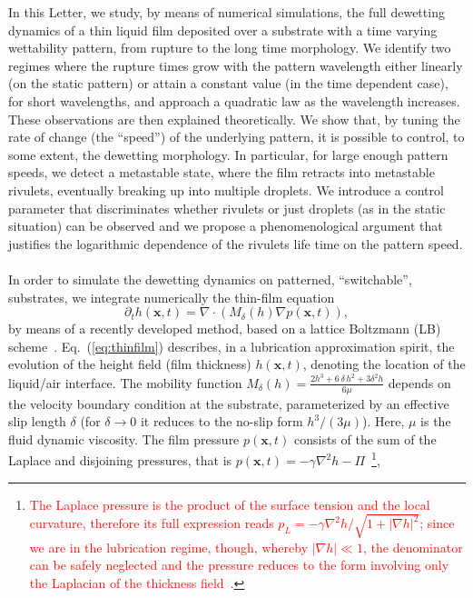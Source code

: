\documentclass[twocolumn,amsmath,amssymb,showpacs,prl,superscriptaddress]{revtex4-1} %
\begin{document}
In this Letter, we study, by means of numerical simulations, the full dewetting dynamics of a thin liquid film deposited over a substrate with a time varying wettability pattern, from rupture to the long time morphology. 
We identify two regimes where the rupture times grow with the pattern wavelength either linearly (on the static pattern) or attain a constant value (in the time dependent case), for short wavelengths, and approach a quadratic law as the wavelength increases. These observations are then explained theoretically.
We show that, by tuning the rate of change (the ``speed'') of the underlying pattern, it is possible to control, to some extent, the dewetting morphology. In particular, for large enough pattern speeds, we detect a metastable state, where the film retracts into metastable rivulets, eventually breaking up into multiple droplets.
We introduce a control parameter that discriminates whether rivulets or just droplets (as in the static situation)
can be observed and we propose a phenomenological argument that justifies the logarithmic dependence of the rivulets life time on the pattern speed.\\
\\
 In order to simulate the dewetting dynamics on patterned, ``switchable'', substrates, we integrate numerically the thin-film equation~\cite{ReynoldsLubr,RevModPhys.69.931,RevModPhys.81.1131} 
\begin{equation}\label{eq:thinfilm}
    \partial_t h(\mathbf{x},t) = \nabla\cdot\left(M_{\delta}(h)\nabla p(\mathbf{x},t)\right),
\end{equation}
by means of a recently developed method, based on a lattice Boltzmann (LB) scheme~\cite{PhysRevE.100.033313,PhysRevE.104.034801, Zitz2022}.
Eq.~(\ref{eq:thinfilm}) describes, in a lubrication approximation spirit, the evolution of the height field (film thickness) $h(\mathbf{x},t)$, denoting the location of the liquid/air interface. The mobility function 
$M_{\delta}(h) = \frac{2h^3 + 6\,\delta\, h^2 + 3\delta^2h}{6\mu}$
depends on the velocity boundary condition at the substrate, parameterized by an effective slip length $\delta$
(for $\delta \rightarrow 0$ it reduces to the no-slip form $h^3/(3\mu)$). Here, $\mu$ is the fluid dynamic viscosity.
The film pressure $p(\mathbf{x},t)$ consists of the sum of the Laplace and disjoining pressures, that is $p(\mathbf{x},t) = -\gamma \nabla^2 h - \Pi$~\footnote{\textcolor{red}{The Laplace pressure is the product of the surface tension 
and the local curvature, therefore its full expression reads $p_L = -\gamma \nabla^2 h/\sqrt{1+|\nabla h|^2}$; 
since we are in the lubrication regime, though, whereby $|\nabla h| \ll 1$, the denominator can be safely neglected 
and the pressure reduces to the form involving only the Laplacian of the thickness 
field~\cite{Benet2014,alizadeh_pahlavan_cueto-felgueroso_hosoi_mckinley_juanes_2018}.}}, 
\end{document}
